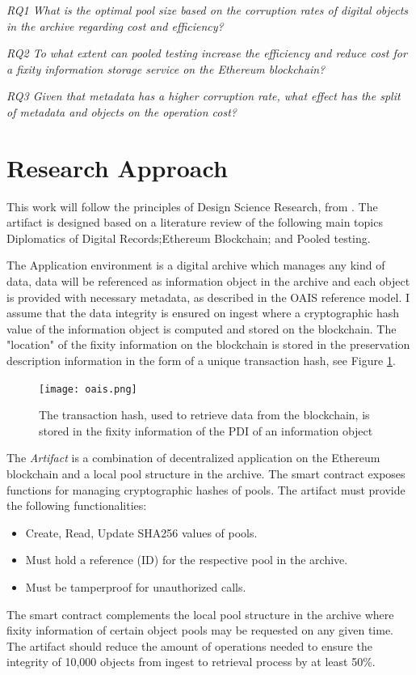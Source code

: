 \textit{RQ1 What is the optimal pool size based on the corruption rates of digital objects in the archive regarding cost and efficiency?}

\textit{RQ2 To what extent can pooled testing increase the efficiency and reduce cost for a fixity information storage service on the Ethereum blockchain?}

\textit{RQ3 Given that metadata has a higher corruption rate, what effect has the split of metadata and objects on the operation cost?}

\section{Research Approach}
\label{sec:approach}
This work will follow the principles of Design Science Research, from \cite{hevner2007three}. The artifact is designed based on a literature review of the following main topics Diplomatics of Digital Records;Ethereum Blockchain; and Pooled testing.

The Application environment is a digital archive which manages any kind of data, data will be referenced as information object in the archive and each object is provided with necessary metadata, as described in the OAIS reference model. I assume that the data integrity is ensured on ingest where a cryptographic hash value of the information object is computed and stored on the blockchain. The "location" of the fixity information on the blockchain is stored in the preservation description information in the form of a unique transaction hash, see Figure \ref{fig:oais-fixity}. 

\begin{figure}[t]
  \label{fig:oais-fixity}
  \centering
  \texttt{[image: oais.png]}
  \caption{The transaction hash, used to retrieve data from the blockchain, is stored in the fixity information of the PDI of an information object \cite[7]{lee2010open}}
\end{figure}

The \textit{Artifact} is a combination of decentralized application on the Ethereum blockchain and a local pool structure in the archive. The smart contract exposes functions for managing cryptographic hashes of pools.
The artifact must provide the following functionalities:
\begin{itemize}
  \item Create, Read, Update SHA256 values of pools.
  \item Must hold a reference (ID) for the respective pool in the archive.
  \item Must be tamperproof for unauthorized calls.
\end{itemize}
The smart contract complements the local pool structure in the archive where fixity information of certain object pools may be requested on any given time. The artifact should reduce the amount of operations needed to ensure the integrity of 10,000 objects from ingest to retrieval process by at least 50\%.